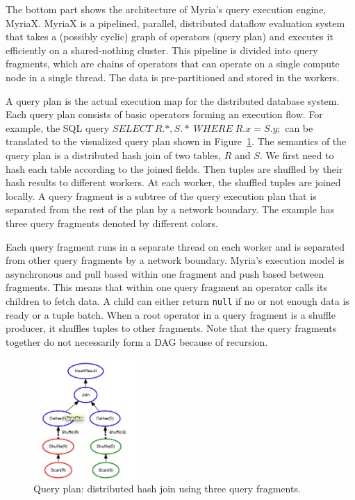 \documentclass[11pt]{scrartcl}
\begin{document}
The bottom part shows the architecture of Myria’s query execution engine, MyriaX. MyriaX is a pipelined, parallel, distributed dataflow evaluation system that takes a (possibly cyclic) graph of operators (query plan) and executes it efficiently on a shared-nothing cluster. This pipeline is divided into query fragments, which are chains of operators that can operate on a single compute node in a single thread. The data is pre-partitioned and stored in the workers.

A query plan is the actual execution map for the distributed database system.  Each query plan consists of basic operators forming an execution flow. For example, the SQL query $SELECT \; R.*, S.*  \; WHERE \; R.x=S.y ;$ can be translated to the visualized query plan shown in Figure~\ref{fig:query_plan}. The semantics of the query plan is a distributed hash join of two tables, $R$ and $S$. We first need to hash each table according to the joined fields. Then tuples are shuffled by their hash results to different workers. At each worker, the shuffled tuples are joined locally. A query fragment is a subtree of the query execution plan that is separated from the rest of the plan by a network boundary. The example has three query fragments denoted by different colors.

Each query fragment runs in a separate thread on each worker and is separated from other query fragments by a network boundary. Myria's execution model is asynchronous and pull based within one fragment and push based between fragments. This means that within one query fragment an operator calls its children to fetch data. A child can either return \texttt{null} if no or not enough data is ready or a tuple batch. When a root operator in a query fragment is a shuffle producer, it shuffles tuples to other fragments. Note that the query fragments together do not necessarily form a DAG because of recursion.

\begin{figure}
 \begin{center}
     \includegraphics[width=0.35\textwidth]{partition_join.png}
   \end{center}
  \caption{Query plan: distributed hash join using three query fragments.}
  \label{fig:query_plan}
\end{figure}
\end{document}
